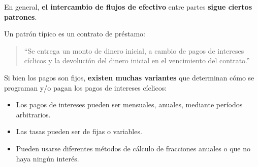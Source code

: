 \documentclass{beamer}
\begin{document}






\begin{frame}
    En general, \textbf{el intercambio de flujos de efectivo} entre partes \textbf{sigue ciertos patrones}. \pause
    \vfill

    Un patrón típico es un contrato de préstamo: \pause

    \vfill

    \begin{quote}
        ``Se entrega un monto de dinero inicial, a cambio de pagos de intereses cíclicos y la devolución del dinero inicial en el vencimiento del contrato.''
    \end{quote}
    \pause
    \vfill

    Si bien los pagos son fijos, \textbf{existen muchas variantes} que determinan cómo se programan y/o pagan los pagos de intereses cíclicos:
    \begin{itemize}
        \pause
        \item Los pagos de intereses pueden ser mensuales, anuales, mediante períodos arbitrarios. 
        \pause
        \item Las tasas pueden ser de fijas o variables.
        \pause
        \item Pueden usarse diferentes métodos de cálculo de fracciones anuales o que no haya ningún interés.
    \end{itemize}

\end{frame}
\end{document}
